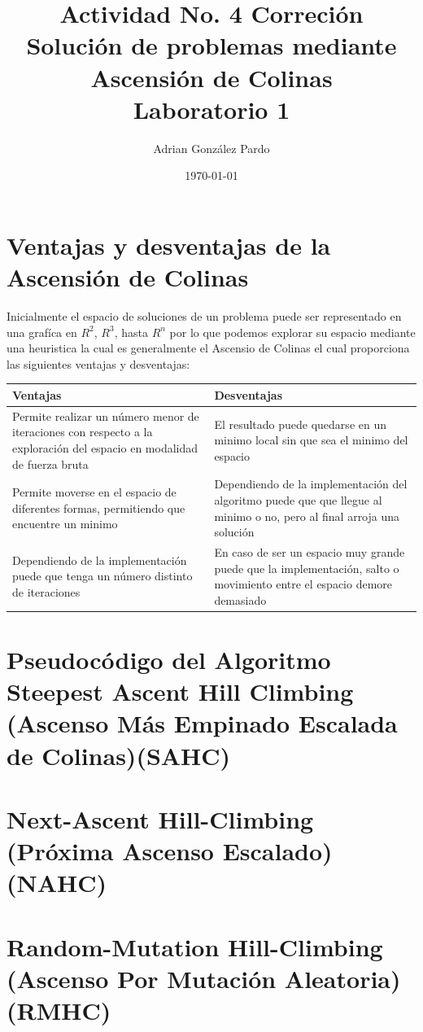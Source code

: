 \documentclass[10pt]{article}
\title{Actividad No. 4 Correción\\ Solución de problemas mediante Ascensión de Colinas\\Laboratorio 1}
\author{Adrian González Pardo}
\date{\today}
\begin{document}
\maketitle
\section{Ventajas y desventajas de la Ascensión de Colinas}
Inicialmente el espacio de soluciones de un problema puede ser representado en una grafíca en $R^{2}$, $R^{3}$, hasta $R^{n}$ por lo que podemos explorar su espacio mediante una heuristica la cual es generalmente el Ascensio de Colinas el cual proporciona las siguientes ventajas y desventajas:
\begin{center}
  \begin{tabular}{| p{6cm} | p{6cm} | }
    \hline
    Ventajas & Desventajas
    \\\hline
    Permite realizar un número menor de iteraciones con respecto a la exploración del espacio en modalidad de fuerza bruta & El resultado puede quedarse en un minimo local sin que sea el minimo del espacio\\
    \hline
    Permite moverse en el espacio de diferentes formas, permitiendo que encuentre un minimo & Dependiendo de la implementación del algoritmo puede que que llegue al minimo o no, pero al final arroja una solución\\\hline
    Dependiendo de la implementación puede que tenga un número distinto de iteraciones & En caso de ser un espacio muy grande puede que la implementación, salto o movimiento entre el espacio demore demasiado\\\hline
  \end{tabular}
\end{center}
\section{Pseudocódigo del Algoritmo Steepest Ascent Hill Climbing (Ascenso Más Empinado Escalada de Colinas)(SAHC)}

\section{Next-Ascent Hill-Climbing (Próxima Ascenso Escalado)(NAHC)}

\section{Random-Mutation Hill-Climbing (Ascenso Por Mutación Aleatoria)(RMHC)}

\end{document}
